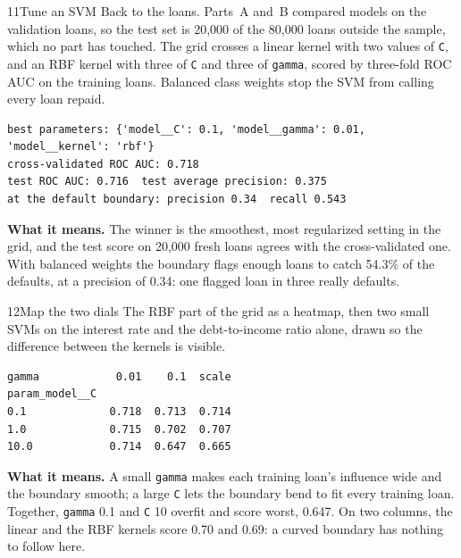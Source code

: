 \begin{labquestion}{11}{Tune an SVM}
Back to the loans. Parts~A and~B compared models on the validation loans, so the test set is 20,000 of the 80,000 loans outside the sample, which no part has touched. The grid crosses a linear kernel with two values of \texttt{C}, and an RBF kernel with three of \texttt{C} and three of \texttt{gamma}, scored by three-fold ROC AUC on the training loans. Balanced class weights stop the SVM from calling every loan repaid.
\end{labquestion}
\begin{labanswer}

\begin{refoutput}
\begin{lstlisting}[style=utpterminal]
best parameters: {'model__C': 0.1, 'model__gamma': 0.01, 'model__kernel': 'rbf'}
cross-validated ROC AUC: 0.718
test ROC AUC: 0.716  test average precision: 0.375
at the default boundary: precision 0.34  recall 0.543
\end{lstlisting}
\end{refoutput}

\textbf{What it means.} The winner is the smoothest, most regularized setting in the grid, and the test score on 20,000 fresh loans agrees with the cross-validated one. With balanced weights the boundary flags enough loans to catch 54.3\% of the defaults, at a precision of 0.34: one flagged loan in three really defaults.
\end{labanswer}

\begin{labquestion}{12}{Map the two dials}
The RBF part of the grid as a heatmap, then two small SVMs on the interest rate and the debt-to-income ratio alone, drawn so the difference between the kernels is visible.
\end{labquestion}
\begin{labanswer}

\begin{refoutput}
\begin{lstlisting}[style=utpterminal]
gamma            0.01    0.1  scale
param_model__C
0.1             0.718  0.713  0.714
1.0             0.715  0.702  0.707
10.0            0.714  0.647  0.665
\end{lstlisting}
\end{refoutput}

\textbf{What it means.} A small \texttt{gamma} makes each training loan's influence wide and the boundary smooth; a large \texttt{C} lets the boundary bend to fit every training loan. Together, \texttt{gamma} 0.1 and \texttt{C} 10 overfit and score worst, 0.647. On two columns, the linear and the RBF kernels score 0.70 and 0.69: a curved boundary has nothing to follow here.
\end{labanswer}

